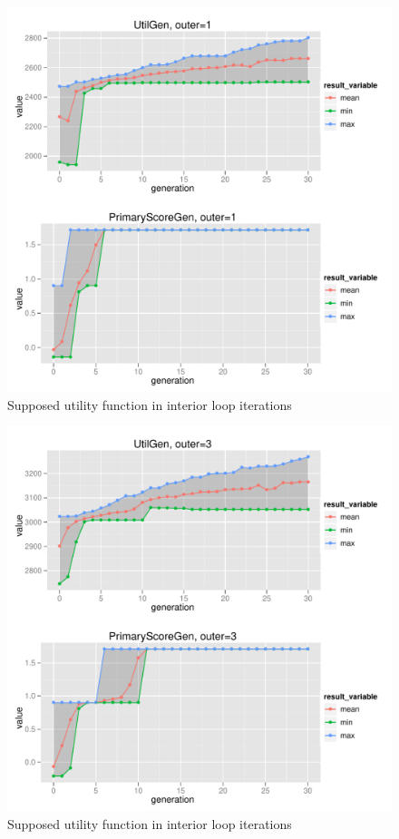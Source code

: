 \begin{figure}
  \centering \includegraphics[width=1.0\textwidth]{exp/nouncert/c2_utilgen_01}
  \caption{Supposed utility function in interior loop iterations}
  \label{c2_utilgen_01}
\end{figure}

\begin{figure}
  \centering \includegraphics[width=1.0\textwidth]{exp/nouncert/c2_utilgen_03}
  \caption{Supposed utility function in interior loop iterations}
  \label{c2_utilgen_03}
\end{figure}

